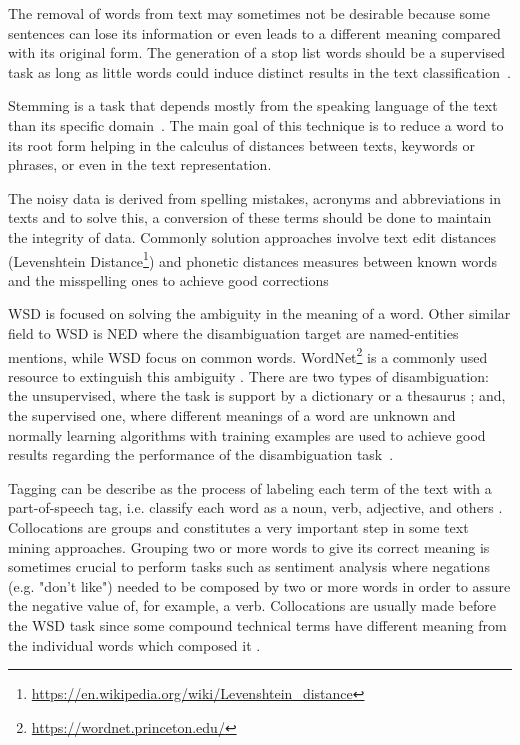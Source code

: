 The removal of words from text may sometimes not be desirable because some sentences can lose its information or even leads to a different meaning compared with its original form. The generation of a stop list words should be a supervised task as long as little words could induce distinct results in the text classification~\cite{riloff1995little}.

Stemming is a task that depends mostly from the speaking language of the text than its specific domain~\cite{stavrianou2007overview}. The main goal of this technique is to reduce a word to its root form helping in the calculus of distances between texts, keywords or phrases, or even in the text representation.

The noisy data is derived from spelling mistakes, acronyms and abbreviations in texts and to solve this, a conversion of these terms should be done to maintain the integrity of data. Commonly solution approaches involve text edit distances (Levenshtein Distance\footnote{\url{https://en.wikipedia.org/wiki/Levenshtein_distance}}) and phonetic distances measures between known words and the misspelling ones to achieve good corrections~\cite{bontcheva2013twitie} 

\gls{WSD} is focused on solving the ambiguity in the meaning of a word. Other similar field to \gls{WSD} is \gls{NED} where the disambiguation target are named-entities mentions, while \gls{WSD} focus on common words. WordNet\footnote{\url{https://wordnet.princeton.edu/}} is a commonly used resource to extinguish this ambiguity \cite{chang2016comparison}. There are two types of disambiguation: the unsupervised, where the task is support by a dictionary or a thesaurus \cite{stavrianou2007overview}; and, the supervised one, where different meanings of a word are unknown and normally learning algorithms with training examples are used to achieve good results regarding the performance of the disambiguation task~\cite{yarowsky1995unsupervised}.

Tagging can be describe as the process of labeling each term of the text with a part-of-speech tag, i.e. classify each word as a noun, verb, adjective, and others \cite{hotho2005brief}. Collocations are groups and constitutes a very important step in some text mining approaches. Grouping two or more words to give its correct meaning is sometimes crucial to perform tasks such as sentiment analysis where negations (e.g. "don't like") needed to be composed by two or more words in order to assure the negative value of, for example, a verb. Collocations are usually made before the \gls{WSD} task since some compound technical terms have different meaning from the individual words which composed it \cite{stavrianou2007overview}.

